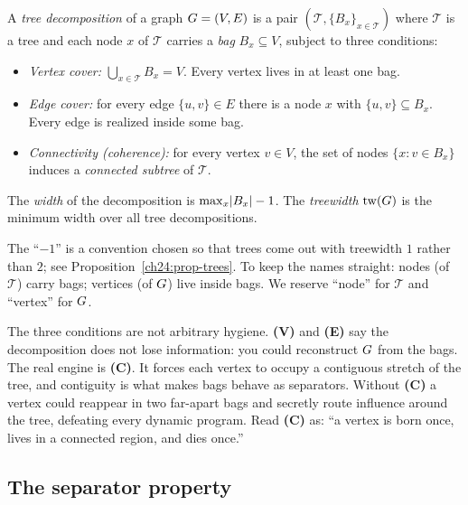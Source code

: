 \begin{definition}
\label{ch24:def-td}
A \emph{tree decomposition} of a graph $G=(V,E)$ is a pair $(\mathcal{T},
\{B_x\}_{x\in \mathcal{T}})$ where $\mathcal{T}$ is a tree and each node $x$ of
$\mathcal{T}$ carries a \emph{bag} $B_x\subseteq V$, subject to three conditions:
\begin{itemize}
  \item[\textbf{(V)}] \emph{Vertex cover:} $\bigcup_{x\in\mathcal{T}} B_x = V$.
        Every vertex lives in at least one bag.
  \item[\textbf{(E)}] \emph{Edge cover:} for every edge $\{u,v\}\in E$ there is a
        node $x$ with $\{u,v\}\subseteq B_x$. Every edge is realized inside some
        bag.
  \item[\textbf{(C)}] \emph{Connectivity (coherence):} for every vertex $v\in V$,
        the set of nodes $\{x : v\in B_x\}$ induces a \emph{connected subtree} of
        $\mathcal{T}$.
\end{itemize}
The \emph{width} of the decomposition is $\max_{x}\lvert B_x\rvert-1$. The
\emph{treewidth} $\operatorname{tw}(G)$ is the minimum width over all tree decompositions.
\end{definition}

The ``$-1$'' is a convention chosen so that trees come out with treewidth $1$
rather than $2$; see Proposition~\ref{ch24:prop-trees}. To keep the names
straight: nodes (of $\mathcal{T}$) carry bags; vertices (of $G$) live inside
bags. We reserve ``node'' for $\mathcal{T}$ and ``vertex'' for $G$.

\begin{focusbox}
The three conditions are not arbitrary hygiene. \textbf{(V)} and \textbf{(E)} say
the decomposition does not lose information: you could reconstruct $G$ from the
bags. The real engine is \textbf{(C)}. It forces each vertex to occupy a
contiguous stretch of the tree, and contiguity is what makes bags behave as
separators. Without \textbf{(C)} a vertex could reappear in two far-apart bags and
secretly route influence around the tree, defeating every dynamic program. Read
\textbf{(C)} as: ``a vertex is born once, lives in a connected region, and dies
once.''
\end{focusbox}

\subsection{The separator property}

